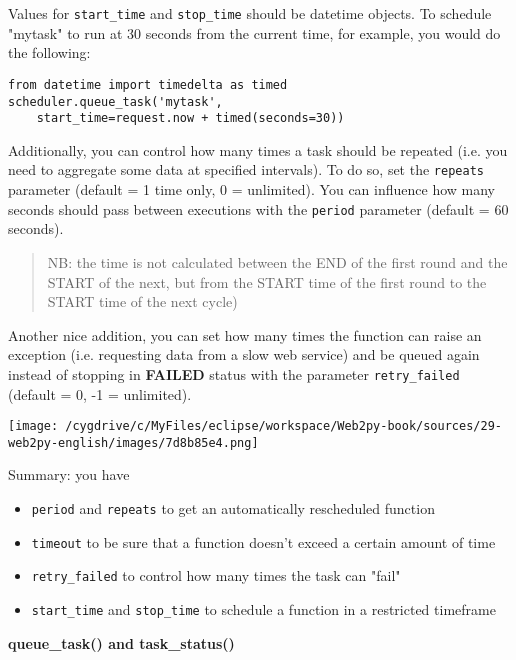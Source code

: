 \documentclass[justified,sixbynine,notoc]{tufte-book}
\def\ft{\small\tt}
\begin{document}
\begin{fullwidth}
Values for {\ft start\_time} and {\ft stop\_time} should be datetime objects. To schedule "mytask" to run at 30 seconds from the current time, for example, you would do the following:

\begin{lstlisting}
from datetime import timedelta as timed
scheduler.queue_task('mytask',
    start_time=request.now + timed(seconds=30))
\end{lstlisting}

Additionally, you can control how many times a task should be repeated (i.e. you need to aggregate some data at specified intervals). To do so, set the {\ft repeats}
parameter (default = 1 time only, 0 = unlimited). You can influence how many seconds should pass between executions with the {\ft period} parameter (default = 60 seconds).

\begin{quote}NB: the time is not calculated between the END of the first round and the START of the next, but from the START time of the first round to the START time of the next cycle)\end{quote}
Another nice addition, you can set how many times the function can raise an exception (i.e. requesting data from a slow web service) and be queued again instead of stopping in {\bf FAILED}  status with the parameter {\ft retry\_failed} (default = 0, -1 = unlimited).


\goodbreak\begin{center}\texttt{[image: /cygdrive/c/MyFiles/eclipse/workspace/Web2py-book/sources/29-web2py-english/images/7d8b85e4.png]}\end{center}


Summary: you have
\begin{itemize}
\item {\ft period} and {\ft repeats} to get an automatically rescheduled function

\item {\ft timeout} to be sure that a function doesn't exceed a certain amount of time

\item {\ft retry\_failed} to control how many times the task can "fail"

\item {\ft start\_time} and {\ft stop\_time} to schedule a function in a restricted timeframe
\end{itemize}

{\bf queue\_task() and task\_status()}


\end{fullwidth}
\end{document}
